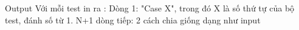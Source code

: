 Output
Với mỗi test in ra : Dòng 1: "Case X", trong đó X là số thứ tự của bộ test, đánh số từ 1. N+1 dòng tiếp: 2 cách chia giống dạng như input